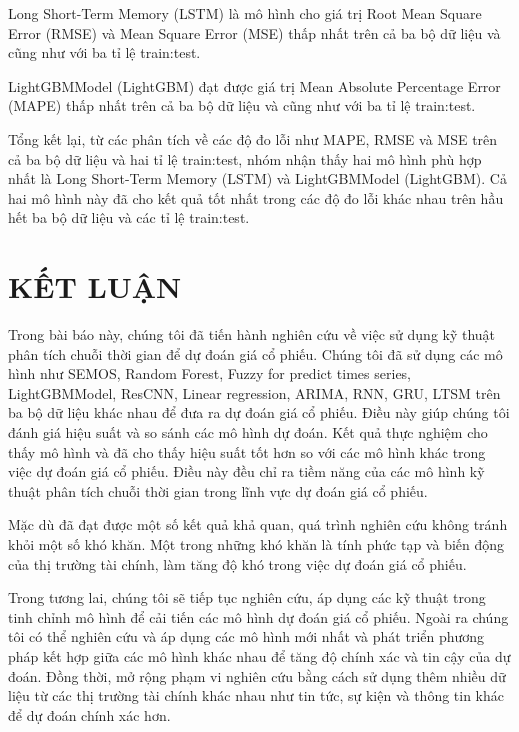 \documentclass[conference]{IEEEtran}
\begin{document}
Long Short-Term Memory (LSTM) là mô hình cho giá trị Root Mean Square Error (RMSE) và Mean Square Error (MSE) thấp nhất trên cả ba bộ dữ liệu 
và cũng như với ba tỉ lệ train:test.

LightGBMModel (LightGBM) đạt được giá trị Mean Absolute Percentage Error (MAPE) thấp nhất trên cả ba bộ dữ liệu và 
cũng như với ba tỉ lệ train:test.

Tổng kết lại, từ các phân tích về các độ đo lỗi như MAPE, RMSE và MSE trên cả ba bộ dữ liệu và hai tỉ lệ train:test, 
nhóm nhận thấy hai mô hình phù hợp nhất là Long Short-Term Memory (LSTM) và LightGBMModel (LightGBM). 
Cả hai mô hình này đã cho kết quả tốt nhất trong các độ đo lỗi khác nhau trên hầu hết ba bộ dữ liệu và các tỉ lệ train:test.

\section{KẾT LUẬN}
Trong bài báo này, chúng tôi đã tiến hành nghiên cứu về việc sử dụng kỹ thuật phân tích chuỗi thời gian để dự đoán giá cổ phiếu. 
Chúng tôi đã sử dụng các mô hình như SEMOS, Random Forest, Fuzzy for predict times series, LightGBMModel, ResCNN, Linear regression, 
ARIMA, RNN, GRU, LTSM trên ba bộ dữ liệu khác nhau để đưa ra dự đoán giá cổ phiếu. 
Điều này giúp chúng tôi đánh giá hiệu suất và so sánh các mô hình dự đoán. Kết quả thực nghiệm cho thấy mô hình 
và đã cho thấy hiệu suất tốt hơn so với các mô hình khác trong việc dự đoán giá cổ phiếu. 
Điều này đều chỉ ra tiềm năng của các mô hình kỹ thuật phân tích chuỗi thời gian trong lĩnh vực dự đoán giá cổ phiếu.

Mặc dù đã đạt được một số kết quả khả quan, quá trình nghiên cứu không tránh khỏi một số khó khăn. 
Một trong những khó khăn là tính phức tạp và biến động của thị trường tài chính, làm tăng độ khó trong việc dự đoán giá cổ phiếu. 

Trong tương lai, chúng tôi sẽ tiếp tục nghiên cứu, áp dụng các kỹ thuật trong tinh chỉnh mô hình để cải tiến các mô hình 
dự đoán giá cổ phiếu. Ngoài ra chúng tôi có thể nghiên cứu và áp dụng các mô hình mới nhất và phát triển phương pháp kết hợp 
giữa các mô hình khác nhau để tăng độ chính xác và tin cậy của dự đoán. Đồng thời, mở rộng phạm vi nghiên cứu bằng cách sử dụng 
thêm nhiều dữ liệu từ các thị trường tài chính khác nhau như tin tức, sự kiện và thông tin khác để dự đoán chính xác hơn.
\end{document}
